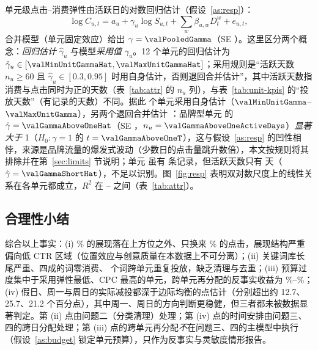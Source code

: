 单元级点击--消费弹性由活跃日的对数回归估计（假设~\ref{as:resp}）：
\begin{equation}\label{eq:elast}
\log C_{u,t}=a_u+\gamma_u\log S_{u,t}+\sum_{w}\beta_{u,w}D^{w}_t+e_{u,t},
\end{equation}
合并模型（单元固定效应）给出 $\gamma=\valPooledGamma$（SE \valPooledGammaSe）。这里区分两个概念：\emph{回归估计} $\hat\gamma_u$ 与模型\emph{采用值} $\gamma_u$。12 个单元的回归估计为 $\hat\gamma_u\in[\valMinUnitGammaHat,\valMaxUnitGammaHat]$；采用规则是“活跃天数 $n_u\ge 60$ 且 $\hat\gamma_u\in[0.3,0.95]$ 时用自身估计，否则退回合并估计”，其中活跃天数指消费与点击同时为正的天数（表~\ref{tab:attr} 的 $n_u$ 列），与表~\ref{tab:unit-kpis} 的“投放天数”（有记录的天数）不同。据此 \valUnitsWithOwnGamma{} 个单元采用自身估计（$\valMinUnitGamma$--$\valMaxUnitGamma$），另两个退回合并估计 \valPooledGamma：品牌型单元 \valGammaAboveOneUnitId{} 的 $\hat\gamma=\valGammaAboveOneHat$（SE \valGammaAboveOneSe，$n_u=\valGammaAboveOneActiveDays$）\emph{显著大于} 1（$H_0:\gamma=1$ 的 $t=\valGammaAboveOneT$），这与假设~\ref{as:resp} 的凹性相悖，来源是品牌流量的爆发式波动（少数日的点击量跳升数倍），本文按规则将其排除并在第~\ref{sec:limits} 节说明；单元 \valGammaShortUnitId{} 虽有 \valGammaShortDays{} 条记录，但活跃天数只有 \valGammaShortActiveDays{} 天（$\hat\gamma=\valGammaShortHat$），不足以识别。图~\ref{fig:resp} 表明双对数尺度上的线性关系在各单元都成立，$R^2$ 在 \valMinUnitGammaRsq--\valMaxUnitGammaRsq{} 之间（表~\ref{tab:attr}）。




\subsection{合理性小结}
综合以上事实：(i) \valOtherRegionImpSharePct\% 的展现落在上方位之外、只换来 \valOtherRegionClickSharePct\% 的点击，展现结构严重偏向低 CTR 区域（位置效应与创意质量在本数据上不可分离）；(ii) 关键词库长尾严重、四成的词零消费、\valSharedKeywordIds{} 个词跨单元重复投放，缺乏清理与去重；(iii) 预算过度集中于采用弹性最低、CPC 最高的单元，跨单元再分配的反事实收益为 \valQthreeCrossUnitGainPctFeb\%--\valQthreeCrossUnitGainPctAug\%；(iv) 假日、周一与周日的实际减投都深于边际均衡的点估计（分别超出约 \num{12.7}、\num{25.7}、\num{21.2} 个百分点），其中周一、周日的方向判断更稳健，但三者都未被数据显著判定。第 (ii) 点由问题二（分类清理）处理；第 (iv) 点的时间安排由问题三、四的跨日分配处理；第 (iii) 点的跨单元再分配\emph{不}在问题三、四的主模型中执行（假设~\ref{as:budget} 锁定单元预算），只作为反事实与灵敏度情形报告。
